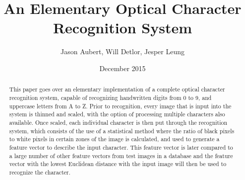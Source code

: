 \documentclass[twocolumn]{article}
\begin{document}
\title{An Elementary Optical Character Recognition System}
\author{Jason Aubert, Will Detlor, Jesper Leung}
\date{December 2015}
\begin{titlepage}
\maketitle
\end{titlepage}



\maketitle

\begin{abstract}
\justify
This paper goes over an elementary implementation of a complete optical character recognition system, capable of recognizing handwritten digits from 0 to 9, and uppercase letters from A to Z. Prior to recognition, every image that is input into the system is thinned and scaled, with the option of processing multiple characters also available. Once scaled, each individual character is then put through the recognition system, which consists of the use of a statistical method where the ratio of black pixels to white pixels in certain zones of the image is calculated, and used to generate a feature vector to describe the input character. This feature vector is later compared to a large number of other feature vectors from test images in a database and the feature vector with the lowest Euclidean distance with the input image will then be used to recognize the character.
\end{abstract}
\end{document}
